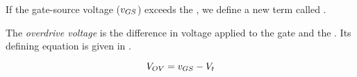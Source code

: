 If the gate-source voltage ($v_{GS}$) exceeds the , we define a new term called .

\begin{definition}\label{def:Overdrive_Voltage}
  The \emph{overdrive voltage} is the difference in voltage applied to the gate and the .
  Its defining equation is given in .

  \begin{equation}\label{eq:Overdrive_Voltage}
    V_{OV} = v_{GS} - V_{t}
  \end{equation}
\end{definition}


